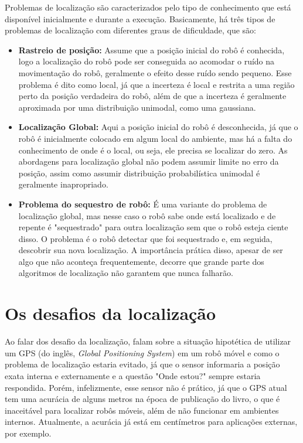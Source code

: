 \documentclass[acronym, symbols, table, deposito]{fei}
\begin{document}
			Problemas de localização são caracterizados pelo tipo de conhecimento que está disponível inicialmente e durante a execução. Basicamente, há três tipos de problemas de localização com diferentes graus de dificuldade, que são:
			
			\begin{itemize}
				\item \textbf{Rastreio de posição:} Assume que a posição inicial do robô é conhecida, logo a localização do robô pode ser conseguida ao acomodar o ruído na movimentação do robô, geralmente o efeito desse ruído sendo pequeno. Esse problema é dito como local, já que a incerteza é local e restrita a uma região perto da posição verdadeira do robô, além de que a incerteza é geralmente aproximada por uma distribuição unimodal, como uma gaussiana.
				
				\item \textbf{Localização Global:} Aqui a posição inicial do robô é desconhecida, já que o robô é inicialmente colocado em algum local do ambiente, mas há a falta do conhecimento de onde é o local, ou seja, ele precisa se localizar do zero. As abordagens para localização global não podem assumir limite no erro da posição, assim como assumir distribuição probabilística unimodal é geralmente inapropriado.
				
				\item \textbf{Problema do sequestro de robô:} É uma variante do problema de localização global, mas nesse caso o robô sabe onde está localizado e de repente é "sequestrado" para outra localização sem que o robô esteja ciente disso. O problema é o robô detectar que foi sequestrado e, em seguida, descobrir sua nova localização. A importância prática disso, apesar de ser algo que não aconteça frequentemente, decorre que grande parte dos algoritmos de localização não garantem que nunca falharão.
			\end{itemize}
			
		\section{Os desafios da localização}
		
			Ao falar dos desafio da localização, \textcite{siegwart2011introduction} falam sobre a situação hipotética de utilizar um GPS (do inglês, \textit{Global Positioning System}) em um robô móvel e como o problema de localização estaria evitado, já que o sensor informaria a posição exata interna e externamente e a questão "Onde estou?" sempre estaria respondida. Porém, infelizmente, esse sensor não é prático, já que o GPS atual tem uma acurácia de alguns metros na época de publicação do livro, o que é inaceitável para localizar robôs móveis, além de não funcionar em ambientes internos. Atualmente, a acurácia já está em centímetros para aplicações externas, por exemplo. 
			
\end{document}
